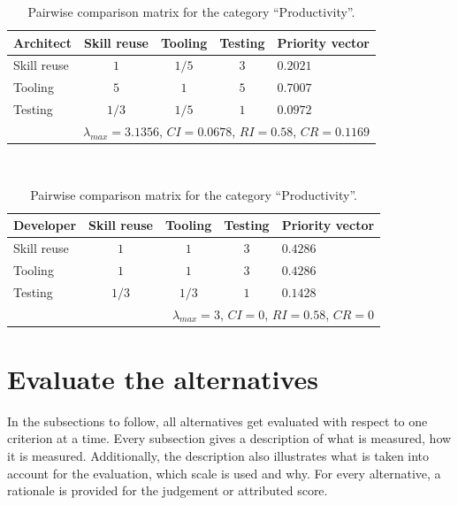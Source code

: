 \begin{table}[h!]
    \begin{center}
        \begin{tabular}{lcccl}
            \hline
            \textbf{Architect} & Skill reuse & Tooling & Testing & Priority vector \\
            \hline
            Skill reuse        & $1$         & $1/5$   & $3$     & $0.2021$        \\
            Tooling            & $5$         & $1$     & $5$     & $0.7007$        \\
            Testing            & $1/3$       & $1/5$   & $1$     & $0.0972$        \\
            \hline
            \multicolumn{5}{r}{$\lambda_{max} = 3.1356$, $CI = 0.0678$, $RI = 0.58$, $CR = 0.1169$}\\
            \hline
        \end{tabular}
        \\\vspace{1em}
        \begin{tabular}{lcccl}
            \hline
            \textbf{Developer} & Skill reuse & Tooling & Testing & Priority vector \\
            \hline
            Skill reuse        & $1$         & $1$     & $3$     & $0.4286$        \\
            Tooling            & $1$         & $1$     & $3$     & $0.4286$        \\
            Testing            & $1/3$       & $1/3$   & $1$     & $0.1428$        \\
            \hline
            \multicolumn{5}{r}{$\lambda_{max} = 3$, $CI = 0$, $RI = 0.58$, $CR = 0$}               \\
            \hline
        \end{tabular}
        \caption{Pairwise comparison matrix for the category ``Productivity''.}
        \label{tab:productivity}
    \end{center}
\end{table}


\section{Evaluate the alternatives}

In the subsections to follow, all alternatives get evaluated with respect to one criterion at a time. Every subsection gives a description of what is measured, how it is measured. Additionally, the description also illustrates what is taken into account for the evaluation, which scale is used and why. For every alternative, a rationale is provided for the judgement or attributed score.

